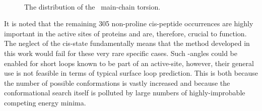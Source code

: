 \begin{figure}[htbp]
  \begin{center}
    \mbox{
       \quad
      }
    \caption{The distribution of the \Omg\ main-chain torsion.}
    \label{fig:reducedrep:omg}
  \end{center}
\end{figure}

It is noted that the remaining 305 non-proline cis-peptide occurrences are  highly important in the active sites of proteins and are, therefore, crucial to function. The neglect of the cis-state fundamentally means that the method developed in this work would  fail for these very rare specific cases. Such \Omg-angles could be enabled for short loops known to be part of an active-site, however, their general use is not feasible in terms of typical surface loop prediction. This is  both because the number of possible conformations is vastly increased and because the conformational search itself is polluted by large numbers of highly-improbable competing energy minima.


